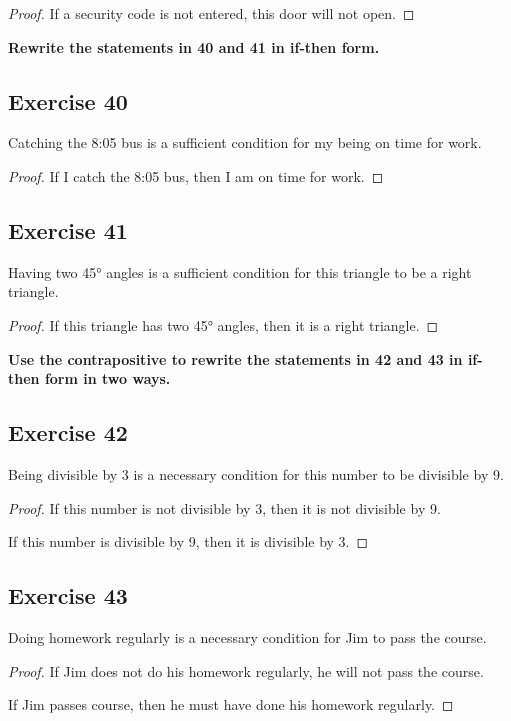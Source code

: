 \documentclass[14pt]{extarticle}
\begin{document}
\begin{proof}
    If a security code is not entered, this door will not open.
\end{proof}

{\bf Rewrite the statements in 40 and 41 in if-then form.}

\subsection{Exercise 40}
Catching the 8:05 bus is a sufficient condition for my being on time for work.

\begin{proof}
    If I catch the 8:05 bus, then I am on time for work.
\end{proof}

\subsection{Exercise 41}
Having two 45° angles is a sufficient condition for this triangle to be a right triangle.

\begin{proof}
    If this triangle has two 45° angles, then it is a right triangle.
\end{proof}

{\bf Use the contrapositive to rewrite the statements in 42 and 43 in if-then form in two ways.}

\subsection{Exercise 42}
Being divisible by 3 is a necessary condition for this number to be divisible by 9.

\begin{proof}
    If this number is not divisible by 3, then it is not divisible by 9.

    If this number is divisible by 9, then it is divisible by 3. \end{proof}

\subsection{Exercise 43}
Doing homework regularly is a necessary condition for Jim to pass the course.

\begin{proof}
    If Jim does not do his homework regularly, he will not pass the course.

    If Jim passes course, then he must have done his homework regularly.
\end{proof}
\end{document}
